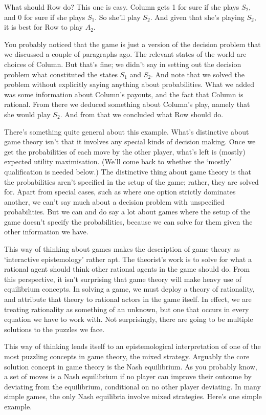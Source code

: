 \noindent What should Row do? This one is easy. Column gets 1 for sure if she plays $S_2$, and 0 for sure if she plays $S_1$. So she'll play $S_2$. And given that she's playing $S_2$, it is best for Row to play $A_2$.

You probably noticed that the game is just a version of the decision problem that we discussed a couple of paragraphs ago. The relevant states of the world are choices of Column. But that's fine; we didn't say in setting out the decision problem what constituted the states $S_1$ and $S_2$. And note that we solved the problem without explicitly saying anything about probabilities. What we added was some information about Column's payouts, and the fact that Column is rational. From there we deduced something about Column's play, namely that she would play $S_2$. And from that we concluded what Row should do.

There's something quite general about this example. What's distinctive about game theory isn't that it involves any special kinds of decision making. Once we get the probabilities of each move by the other player, what's left is (mostly) expected utility maximisation. (We'll come back to whether the `mostly' qualification is needed below.) The distinctive thing about game theory is that the probabilities aren't specified in the setup of the game; rather, they are solved for. Apart from special cases, such as where one option strictly dominates another, we can't say much about a decision problem with unspecified probabilities. But we can and do say a lot about games where the setup of the game doesn't specify the probabilities, because we can solve for them given the other information we have.

This way of thinking about games makes the description of game theory as `interactive epistemology' \citep{Aumann1999} rather apt. The theorist's work is to solve for what a rational agent should think other rational agents in the game should do. From this perspective, it isn't surprising that game theory will make heavy use of equilibrium concepts. In solving a game, we must deploy a theory of rationality, and attribute that theory to rational actors in the game itself. In effect, we are treating rationality as something of an unknown, but one that occurs in every equation we have to work with. Not surprisingly, there are going to be multiple solutions to the puzzles we face.

This way of thinking lends itself to an epistemological interpretation of one of the most puzzling concepts in game theory, the mixed strategy. Arguably the core solution concept in game theory is the Nash equilibrium. As you probably know, a set of moves is a Nash equilibrium if no player can improve their outcome by deviating from the equilibrium, conditional on no other player deviating. In many simple games, the only Nash equilibria involve mixed strategies. Here's one simple example.


